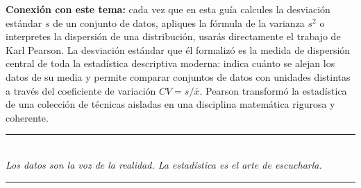 \documentclass[11pt, letterpaper]{article}
\begin{document}
\begin{tcolorbox}
\begin{minipage}[t]{0.78\linewidth}
\medskip
\textbf{Conexi\'on con este tema:} cada vez que en esta gu\'ia calcules la desviaci\'on est\'andar $s$ de un conjunto de datos, apliques la f\'ormula de la varianza $s^2$ o interpretes la dispersi\'on de una distribuci\'on, usar\'as directamente el trabajo de Karl Pearson. La desviaci\'on est\'andar que \'el formaliz\'o es la medida de dispersi\'on central de toda la estad\'istica descriptiva moderna: indica cu\'anto se alejan los datos de su media y permite comparar conjuntos de datos con unidades distintas a trav\'es del coeficiente de variaci\'on $CV = s/\bar{x}$. Pearson transform\'o la estad\'istica de una colecci\'on de t\'ecnicas aisladas en una disciplina matem\'atica rigurosa y coherente.
\end{minipage}
\hfill
\begin{minipage}[t]{0.18\linewidth}
\vspace{0pt}
\end{minipage}

\end{tcolorbox}

\vspace{0.5cm}
\begin{center}
  \textcolor{zenitgold}{\rule{0.5\linewidth}{0.5pt}}\\[0.3cm]
  {\small\itshape\color{zenitnavy} Los datos son la voz de la realidad. La estad\'istica es el arte de escucharla.}\\[0.25cm]
  \textcolor{zenitgold}{\rule{0.5\linewidth}{0.5pt}}
\end{center}

\clearpage
\thispagestyle{empty}
\phantom{x}
\clearpage


\end{document}
